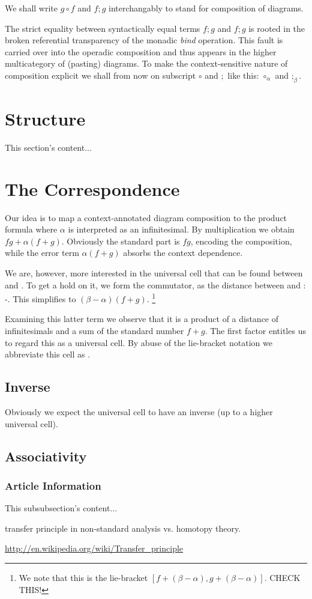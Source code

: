 \documentclass{article}
\begin{document}
We shall write $g \circ f$ and $f;g$ interchangably to stand for
composition of diagrams.

The strict equality between syntactically equal terms $f;g$ and $f;g$
is rooted in the broken referential transparency of the monadic
\emph{bind} operation. This fault is carried over into the operadic
composition and thus appears in the higher multicategory of (pasting)
diagrams. To make the context-sensitive nature of composition explicit
we shall from now on subscript $\circ$ and $;$ like this: ${\circ_\alpha}$
and ${;_\beta}$.

\section{Structure}
This section's content...

\section{The Correspondence}

Our idea is to map a context-annotated diagram composition 
to the product formula  where $\alpha$ is interpreted as
an infinitesimal. By multiplication we obtain $fg+\alpha(f+g)$. Obviously the
standard part is $fg$, encoding the composition, while the error term $\alpha(f+g)$
absorbs the context dependence.

We are, however, more interested in the universal cell that can be found between
  and . To get a hold on it, we form the
commutator, as the distance between  and :
-. This simplifies to $(\beta-\alpha)(f+g)$.
\footnote{We note that this is the lie-bracket $[f+(\beta-\alpha), g+(\beta-\alpha)]$. CHECK THIS!}

Examining this latter term we observe that it is a product of a distance of infinitesimals
and a sum of the standard number $f+g$. The first factor entitles us to regard this as a
universal cell. By abuse of the lie-bracket notation we abbreviate this cell as
.

\subsection{Inverse}

Obviously we expect the universal cell to have an inverse (up to a higher universal cell).

\subsection{Associativity}


\subsubsection{Article Information}
This subsubsection's content...


transfer principle in non-standard analysis vs. homotopy theory.

\url{http://en.wikipedia.org/wiki/Transfer_principle}
\end{document}
